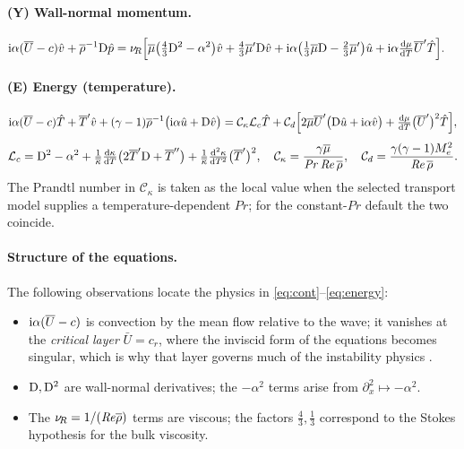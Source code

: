 \documentclass[11pt]{article}
\begin{document}
\paragraph{(Y) Wall-normal momentum.}
\begin{equation}\label{eq:ymom}
\begin{aligned}
  \mathrm{i}\alpha(\overline{U}-c)\hat{v}+\overline{\rho}^{-1}\mathrm{D}\hat{p}
  =\nu_{\!R}\Big[&\overline{\mu}\big(\tfrac43\mathrm{D}^2-\alpha^2\big)\hat{v}+\tfrac43\overline{\mu}'\mathrm{D}\hat{v}
   +\mathrm{i}\alpha\big(\tfrac13\overline{\mu}\mathrm{D}-\tfrac23\overline{\mu}'\big)\hat{u}
   +\mathrm{i}\alpha\tfrac{\mathrm d\mu}{\mathrm dT}\overline{U}'\hat{T}\Big] .
\end{aligned}
\end{equation}

\paragraph{(E) Energy (temperature).}
\begin{equation}\label{eq:energy}
  \mathrm{i}\alpha(\overline{U}-c)\hat{T}+\overline{T}'\hat{v}+(\gamma-1)\overline{\rho}^{-1}\big(\mathrm{i}\alpha\hat{u}+\mathrm{D}\hat{v}\big)
  =\mathcal C_\kappa\mathcal L_c\hat{T}
   +\mathcal C_d\Big[2\overline{\mu}\overline{U}'\big(\mathrm{D}\hat{u}+\mathrm{i}\alpha\hat{v}\big)
     +\tfrac{\mathrm d\mu}{\mathrm dT}\big(\overline{U}'\big)^2\hat{T}\Big],
\end{equation}
\begin{equation}\label{eq:groups}
  \mathcal L_c=\mathrm{D}^2-\alpha^2
   +\tfrac1{\overline{\kappa}}\tfrac{\mathrm d\kappa}{\mathrm dT}\big(2\overline{T}'\mathrm{D}+\overline{T}''\big)
   +\tfrac1{\overline{\kappa}}\tfrac{\mathrm d^2\kappa}{\mathrm dT^2}\big(\overline{T}'\big)^2,\quad
  \mathcal C_\kappa=\frac{\gamma\overline{\mu}}{\mathit{Pr}\,\mathit{Re}\,\overline{\rho}},\quad
  \mathcal C_d=\frac{\gamma(\gamma-1)M_e^2}{\mathit{Re}\,\overline{\rho}}.
\end{equation}
The Prandtl number in $\mathcal C_\kappa$ is taken as the local value when the selected
transport model supplies a temperature-dependent $\mathit{Pr}$; for the constant-$\mathit{Pr}$
default the two coincide.

\paragraph{Structure of the equations.} The following observations locate the physics in
\eqref{eq:cont}--\eqref{eq:energy}:
\begin{itemize}[nosep,leftmargin=1.6em]
  \item $\mathrm{i}\alpha(\overline{U}-c)$ is convection by the mean flow relative to the wave; it vanishes at the
        \emph{critical layer} $\bar U=c_r$, where the inviscid form of the equations becomes singular,
        which is why that layer governs much of the instability physics \cite{mack1984}.
  \item $\mathrm{D},\mathrm{D}^2$ are wall-normal derivatives; the $-\alpha^2$ terms arise from
        $\partial_x^2\mapsto-\alpha^2$.
  \item The $\nu_{\!R}=1/(\mathit{Re}\overline{\rho})$ terms are viscous; the factors $\tfrac43,\tfrac13$ correspond to the
        Stokes hypothesis for the bulk viscosity.
\end{itemize}
\end{document}
